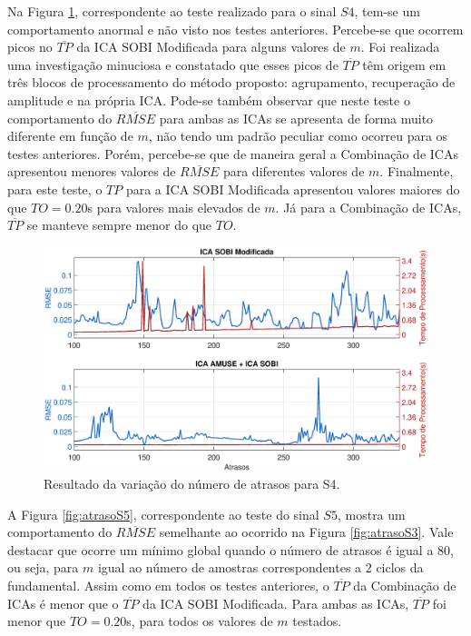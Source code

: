 \documentclass[a4paper,12pt]{monografia}
\theoremstyle{plain}
\theoremstyle{definition}
\theoremstyle{remark}
\begin{document}
Na Figura \ref{fig:atrasoS4}, correspondente ao teste realizado para o sinal $S4$, tem-se um comportamento anormal e não visto nos testes anteriores. Percebe-se que ocorrem picos no $\overline{TP}$ da ICA SOBI Modificada para alguns valores de $m$. Foi realizada uma investigação minuciosa e constatado que esses picos de $\overline{TP}$ têm origem em três blocos de processamento do método proposto: agrupamento, recuperação de amplitude e na própria ICA. Pode-se também observar que neste teste o comportamento do $\overline{RMSE}$ para ambas as ICAs se apresenta de forma muito diferente em função de $m$, não tendo um padrão peculiar como ocorreu para os testes anteriores. Porém, percebe-se que de maneira geral a Combinação de ICAs apresentou menores valores de $\overline{RMSE}$ para diferentes valores de $m$. Finalmente, para este teste, o $TP$ para a ICA SOBI Modificada apresentou valores maiores do que $TO=0.20$s para valores mais elevados de $m$. Já para a Combinação de ICAs, $\overline{TP}$ se manteve sempre menor do que $TO$.

\begin{figure}[!htb]
    \begin{center}
    \advance\leftskip -1.5cm
    \includegraphics[scale=0.45]{imagens/Sinal4Atrasov2.eps}
    \caption{Resultado da variação do número de atrasos para S4.}
    \label{fig:atrasoS4}
    \end{center}
\end{figure}

A Figura \ref{fig:atrasoS5}, correspondente ao teste do sinal $S5$, mostra um comportamento do $\overline{RMSE}$ semelhante ao ocorrido na Figura \ref{fig:atrasoS3}. Vale destacar que ocorre um mínimo global quando o número de atrasos é igual a 80, ou seja, para $m$ igual ao número de amostras correspondentes a 2 ciclos da fundamental. Assim como em todos os testes anteriores, o $\overline{TP}$ da Combinação de ICAs é menor que o $\overline{TP}$ da ICA SOBI Modificada. Para ambas as ICAs, $\overline{TP}$ foi menor que $TO=0.20$s, para todos os valores de $m$ testados.
\end{document}
